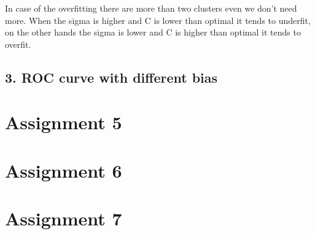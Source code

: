 \documentclass[a4paper,11pt]{article}
\begin{document}
In case of the overfitting there are more than two clusters even we don't need more.
When the sigma is higher and C is lower than optimal it tends to underfit, on the other hands the sigma is lower and C is higher than optimal it tends to overfit.

\subsection*{3. ROC curve with different bias}

\section*{Assignment 5}

\section*{Assignment 6}

\section*{Assignment 7}
\end{document}
